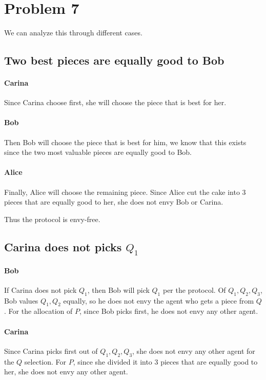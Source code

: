 \documentclass[12pt]{article}
\begin{document}
\newpage

\section*{Problem 7}
We can analyze this through different cases.

\subsection*{Two best pieces are equally good to Bob}
\paragraph*{Carina}
Since Carina choose first, she will choose the piece that is best for her.

\paragraph*{Bob}
Then Bob will choose the piece that is best for him, we know that 
this exists since the two most valuable pieces are equally good to Bob. 

\paragraph*{Alice}
Finally, Alice will choose the remaining piece. Since Alice cut the cake into 3 pieces that are equally good to her, 
she does not envy Bob or Carina. 

Thus the protocol is envy-free.

\subsection*{Carina does not picks $Q_1$}
\paragraph*{Bob}
If Carina does not pick $Q_1$, then Bob will pick $Q_1$ per the protocol. Of $Q_1, Q_2, Q_3$, Bob values 
$Q_1, Q_2$ equally, so he does not envy the agent who gets a piece from $Q$. For the allocation of $P$, since 
Bob picks first, he does not envy any other agent.

\paragraph*{Carina}
Since Carina picks first out of $Q_1, Q_2, Q_3$, she does not envy any other agent for the $Q$ selection. For $P$, 
since she divided it into 3 pieces that are equally good to her, she does not envy any other agent. 
\end{document}
